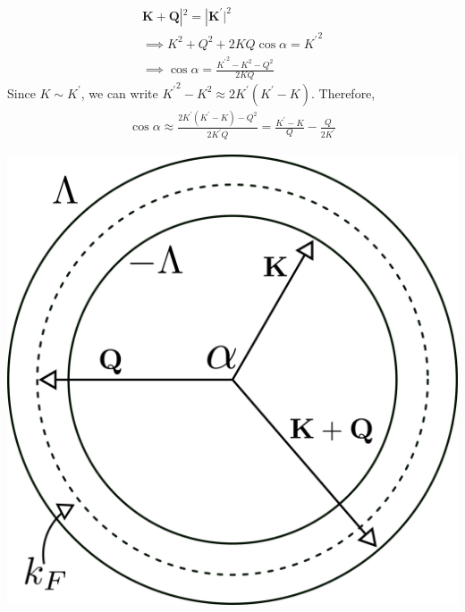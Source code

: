 \documentclass[14pt]{extarticle}
\begin{document}
\begin{minipage}{280pt}
\begin{gather}
\mathbf{K}+\mathbf{Q}|^2 = |\mathbf{K}^\prime|^2\\
\implies K^2 + Q^2 + 2KQ\cos \alpha = {K^\prime}^2\\
\implies \cos \alpha = \frac{{K^\prime}^2 - K^2 - Q^2}{2KQ}
\end{gather}
Since \(K \sim K^\prime\), we can write \({K^\prime}^2 - K^2 \approx 2K^\prime \left(K^\prime - K\right)\). Therefore,
\begin{equation}\begin{aligned}
	\cos \alpha \approx \frac{2K^\prime\left(K^\prime - K\right) - Q^2}{2K^\prime Q} = \frac{K^\prime - K}{Q} - \frac{Q}{2K^\prime}
\end{aligned}\end{equation}
\end{minipage}
\begin{minipage}{250pt}
	\begin{center}\includegraphics[scale=0.28]{./figures/term5.png}\end{center}
\end{minipage}
 
\end{document}
